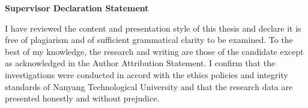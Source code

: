 \begin{titlepage}

\begin{center}
\Large{\bf{Supervisor Declaration Statement}}
\end{center}

\vspace{0.2in}

\begin{spacing}{2}
I have reviewed the content and presentation style of this thesis and declare it is free of plagiarism and of sufficient grammatical clarity to be examined. To the best of my knowledge, the research and writing are those of the candidate except as acknowledged in the Author Attribution Statement. I confirm that the investigations were conducted in accord with the ethics policies and integrity standards of Nanyang Technological University and that the research data are presented honestly and without prejudice.
\end{spacing}

\vspace{2.5cm}

\begin{center}
	\makebox[4cm]{\dotfill}  \hfill \makebox[4cm]{\dotfill}\\
	      \hfill {}
\end{center}
\end{titlepage}
\newpage